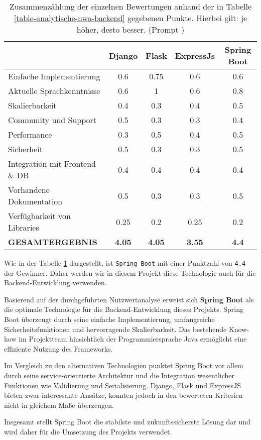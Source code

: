 \begin{table}[H]
	\centering
	\renewcommand{\arraystretch}{1.2}
	\begin{tabular}{|l|c|c|c|c|}
		\hline
		\rowcolor[HTML]{B6D7A8} & \textbf{Django} & \textbf{Flask} & \textbf{ExpressJs} & \textbf{Spring Boot} \\
		\hline
		Einfache Implementierung & 0.6 & 0.75 & 0.6 & 0.6 \\
		\hline
		Aktuelle Sprachkenntnisse & 0.6 & 1 & 0.6 & 0.8 \\
		\hline
		Skalierbarkeit & 0.4 & 0.3 & 0.4 & 0.5 \\
		\hline
		Community und Support & 0.5 & 0.3 & 0.3 & 0.4 \\
		\hline
		Performance & 0.3 & 0.5 & 0.4 & 0.5 \\
		\hline
		Sicherheit & 0.5 & 0.3 & 0.3 & 0.5 \\
		\hline
		Integration mit Frontend \& DB & 0.4 & 0.4 & 0.4 & 0.4 \\
		\hline
		Vorhandene Dokumentation & 0.5 & 0.3 & 0.3 & 0.5 \\
		\hline
		Verfügbarkeit von Libraries & 0.25 & 0.2 & 0.25 & 0.2 \\
		\hline
		\textbf{GESAMTERGEBNIS} & \textbf{4.05} & \textbf{4.05} & \textbf{3.55} & \textbf{4.4} \\
		\hline
	\end{tabular}
	\caption{Zusammenzählung der einzelnen Bewertungen anhand der in Tabelle \ref{table-analytische-nwa-backend} gegebenen Punkte. Hierbei gilt: je höher, desto besser. (Prompt \cite{prompt-gpt-google-sheets-to-table})}
    \label{table-analytische-nwa-backend-result}
\end{table}

Wie in der Tabelle \ref{table-analytische-nwa-backend-result} dargestellt, ist \texttt{Spring Boot} mit einer Punktzahl von \texttt{4.4} der Gewinner. Daher werden wir in diesem Projekt diese Technologie auch für die Backend-Entwicklung verwenden.

Basierend auf der durchgeführten Nutzwertanalyse erweist sich \textbf{Spring Boot} als die optimale Technologie für die Backend-Entwicklung dieses Projekts. Spring Boot überzeugt durch seine einfache Implementierung, umfangreiche Sicherheitsfunktionen und hervorragende Skalierbarkeit. Das bestehende Know-how im Projektteam hinsichtlich der Programmiersprache Java ermöglicht eine effiziente Nutzung des Frameworks.

Im Vergleich zu den alternativen Technologien punktet Spring Boot vor allem durch seine service-orientierte Architektur und die Integration wesentlicher Funktionen wie Validierung und Serialisierung. Django, Flask und ExpressJS bieten zwar interessante Ansätze, konnten jedoch in den bewerteten Kriterien nicht in gleichem Maße überzeugen.

Insgesamt stellt Spring Boot die stabilste und zukunftssicherste Lösung dar und wird daher für die Umsetzung des Projekts verwendet.

